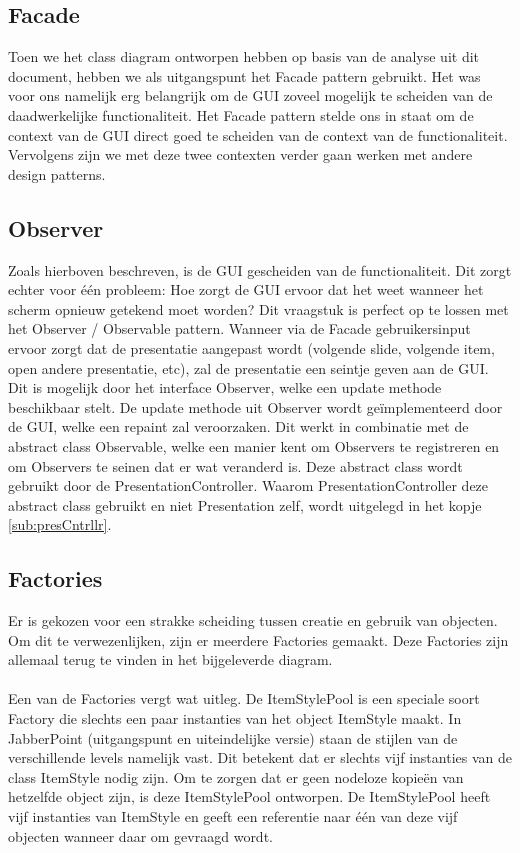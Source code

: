 \documentclass[a4paper]{article}
\newcommand{\1}[0]{\'{e}\'{e}n}
\begin{document}
\subsection{Facade}
Toen we het class diagram ontworpen hebben op basis van de analyse uit dit document, hebben we als uitgangspunt het Facade pattern gebruikt. Het was voor ons namelijk erg belangrijk om de GUI zoveel mogelijk te scheiden van de daadwerkelijke functionaliteit. Het Facade pattern stelde ons in staat om de context van de GUI direct goed te scheiden van de context van de functionaliteit. Vervolgens zijn we met deze twee contexten verder gaan werken met andere design patterns.

\subsection{Observer}
Zoals hierboven beschreven, is de GUI gescheiden van de functionaliteit. Dit zorgt echter voor \1 probleem: Hoe zorgt de GUI ervoor dat het weet wanneer het scherm opnieuw getekend moet worden? Dit vraagstuk is perfect op te lossen met het Observer / Observable pattern. Wanneer via de Facade gebruikersinput ervoor zorgt dat de presentatie aangepast wordt (volgende slide, volgende item, open andere presentatie, etc), zal de presentatie een seintje geven aan de GUI. Dit is mogelijk door het interface Observer, welke een update methode beschikbaar stelt. De update methode uit Observer wordt ge\"{i}mplementeerd door de GUI, welke een repaint zal veroorzaken. Dit werkt in combinatie met de abstract class Observable, welke een manier kent om Observers te registreren en om Observers te seinen dat er wat veranderd is. Deze abstract class wordt gebruikt door de PresentationController. Waarom PresentationController deze abstract class gebruikt en niet Presentation zelf, wordt uitgelegd in het kopje \ref{sub:presCntrllr}.

\subsection{Factories}
Er is gekozen voor een strakke scheiding tussen creatie en gebruik van objecten. Om dit te verwezenlijken, zijn er meerdere Factories gemaakt. Deze Factories zijn allemaal terug te vinden in het bijgeleverde diagram.
\\\\
Een van de Factories vergt wat uitleg. De ItemStylePool is een speciale soort Factory die slechts een paar instanties van het object ItemStyle maakt. In JabberPoint (uitgangspunt en uiteindelijke versie) staan de stijlen van de verschillende levels namelijk vast. Dit betekent dat er slechts vijf instanties van de class ItemStyle nodig zijn. Om te zorgen dat er geen nodeloze kopie\"{e}n van hetzelfde object zijn, is deze ItemStylePool ontworpen. De ItemStylePool heeft vijf instanties van ItemStyle en geeft een referentie naar \1 van deze vijf objecten wanneer daar om gevraagd wordt.
\end{document}
